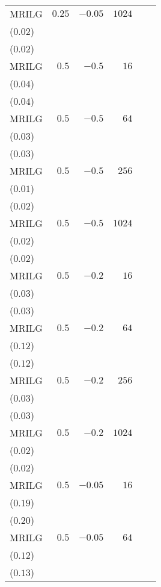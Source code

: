\begin{table}[t]
\begin{tabular}{lrrrrr}
MRILG & \(0.25\) & \(-0.05\) & \(1024\) & \longcell{\(0.30\)\\{\tiny(\(0.02\))}} & \longcell{\(0.31\)\\{\tiny(\(0.02\))}} \\[2.2ex]
MRILG & \(0.5\) & \(-0.5\) & \(16\) & \longcell{\(0.42\)\\{\tiny(\(0.04\))}} & \longcell{\(0.43\)\\{\tiny(\(0.04\))}} \\[2.2ex]
MRILG & \(0.5\) & \(-0.5\) & \(64\) & \longcell{\(0.36\)\\{\tiny(\(0.03\))}} & \longcell{\(0.37\)\\{\tiny(\(0.03\))}} \\[2.2ex]
MRILG & \(0.5\) & \(-0.5\) & \(256\) & \longcell{\(0.33\)\\{\tiny(\(0.01\))}} & \longcell{\(0.34\)\\{\tiny(\(0.02\))}} \\[2.2ex]
MRILG & \(0.5\) & \(-0.5\) & \(1024\) & \longcell{\(0.30\)\\{\tiny(\(0.02\))}} & \longcell{\(0.30\)\\{\tiny(\(0.02\))}} \\[2.2ex]
MRILG & \(0.5\) & \(-0.2\) & \(16\) & \longcell{\(0.43\)\\{\tiny(\(0.03\))}} & \longcell{\(0.44\)\\{\tiny(\(0.03\))}} \\[2.2ex]
MRILG & \(0.5\) & \(-0.2\) & \(64\) & \longcell{\(0.33\)\\{\tiny(\(0.12\))}} & \longcell{\(0.34\)\\{\tiny(\(0.12\))}} \\[2.2ex]
MRILG & \(0.5\) & \(-0.2\) & \(256\) & \longcell{\(0.34\)\\{\tiny(\(0.03\))}} & \longcell{\(0.35\)\\{\tiny(\(0.03\))}} \\[2.2ex]
MRILG & \(0.5\) & \(-0.2\) & \(1024\) & \longcell{\(0.29\)\\{\tiny(\(0.02\))}} & \longcell{\(0.30\)\\{\tiny(\(0.02\))}} \\[2.2ex]
MRILG & \(0.5\) & \(-0.05\) & \(16\) & \longcell{\(0.35\)\\{\tiny(\(0.19\))}} & \longcell{\(0.36\)\\{\tiny(\(0.20\))}} \\[2.2ex]
MRILG & \(0.5\) & \(-0.05\) & \(64\) & \longcell{\(0.34\)\\{\tiny(\(0.12\))}} & \longcell{\(0.35\)\\{\tiny(\(0.13\))}} \\[2.2ex]

\end{tabular}
\end{table}
